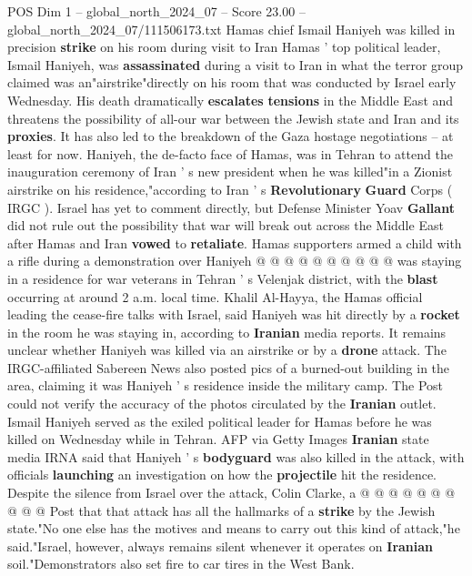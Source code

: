 \begin{textsample}{POS Dim 1 – global\_north\_2024\_07 – Score 23.00 – global\_north\_2024\_07/111506173.txt}  \label{ex:f1_pos_190}
Hamas chief Ismail Haniyeh was killed in precision \textbf{strike} on his room during visit to Iran Hamas ' top political leader, Ismail Haniyeh, was \textbf{assassinated} during a visit to Iran in what the terror group claimed was an"airstrike"directly on his room that was conducted by Israel early Wednesday.
His death dramatically \textbf{escalates} \textbf{tensions} in the Middle East and threatens the possibility of all-our war between the Jewish state and Iran and its \textbf{proxies}.
It has also led to the breakdown of the Gaza hostage negotiations -- at least for now.
Haniyeh, the de-facto face of Hamas, was in Tehran to attend the inauguration ceremony of Iran ' s new president when he was killed"in a Zionist airstrike on his residence,"according to Iran ' s \textbf{Revolutionary} \textbf{Guard} Corps ( IRGC ).
Israel has yet to comment directly, but Defense Minister Yoav \textbf{Gallant} did not rule out the possibility that war will break out across the Middle East after Hamas and Iran \textbf{vowed} to \textbf{retaliate}.
Hamas supporters armed a child with a rifle during a demonstration over Haniyeh @ @ @ @ @ @ @ @ @ @ was staying in a residence for war veterans in Tehran ' s Velenjak district, with the \textbf{blast} occurring at around 2 a.m. local time.
Khalil Al-Hayya, the Hamas official leading the cease-fire talks with Israel, said Haniyeh was hit directly by a \textbf{rocket} in the room he was staying in, according to \textbf{Iranian} media reports.
It remains unclear whether Haniyeh was killed via an airstrike or by a \textbf{drone} attack.
The IRGC-affiliated Sabereen News also posted pics of a burned-out building in the area, claiming it was Haniyeh ' s residence inside the military camp.
The Post could not verify the accuracy of the photos circulated by the \textbf{Iranian} outlet.
Ismail Haniyeh served as the exiled political leader for Hamas before he was killed on Wednesday while in Tehran.
AFP via Getty Images \textbf{Iranian} state media IRNA said that Haniyeh ' s \textbf{bodyguard} was also killed in the attack, with officials \textbf{launching} an investigation on how the \textbf{projectile} hit the residence.
Despite the silence from Israel over the attack, Colin Clarke, a @ @ @ @ @ @ @ @ @ @ Post that that attack has all the hallmarks of a \textbf{strike} by the Jewish state."No one else has the motives and means to carry out this kind of attack,"he said."Israel, however, always remains silent whenever it operates on \textbf{Iranian} soil."Demonstrators also set fire to car tires in the West Bank.

\end{textsample}
